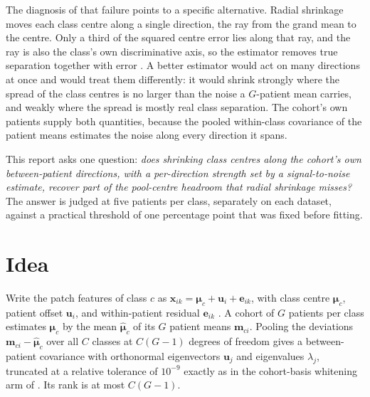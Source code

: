 \documentclass[11pt]{article}
\begin{document}
The diagnosis of that failure points to a specific alternative. Radial shrinkage moves each class centre along a single direction, the ray from the grand mean to the centre. Only a third of the squared centre error lies along that ray, and the ray is also the class's own discriminative axis, so the estimator removes true separation together with error \citep{queisler2026centreShrinkage}. A better estimator would act on many directions at once and would treat them differently: it would shrink strongly where the spread of the class centres is no larger than the noise a $G$-patient mean carries, and weakly where the spread is mostly real class separation. The cohort's own patients supply both quantities, because the pooled within-class covariance of the patient means estimates the noise along every direction it spans.

This report asks one question: \emph{does shrinking class centres along the cohort's own between-patient directions, with a per-direction strength set by a signal-to-noise estimate, recover part of the pool-centre headroom that radial shrinkage misses?} The answer is judged at five patients per class, separately on each dataset, against a practical threshold of one percentage point that was fixed before fitting.

\section{Idea}
\label{sec:idea}
Write the patch features of class $c$ as $\mathbf x_{ik}=\boldsymbol\mu_c+\mathbf u_i+\mathbf e_{ik}$, with class centre $\boldsymbol\mu_c$, patient offset $\mathbf u_i$, and within-patient residual $\mathbf e_{ik}$ \citep{queisler2026centreError}. A cohort of $G$ patients per class estimates $\boldsymbol\mu_c$ by the mean $\hat{\boldsymbol\mu}_c$ of its $G$ patient means $\mathbf m_{ci}$. Pooling the deviations $\mathbf m_{ci}-\hat{\boldsymbol\mu}_c$ over all $C$ classes at $C(G-1)$ degrees of freedom gives a between-patient covariance with orthonormal eigenvectors $\mathbf u_j$ and eigenvalues $\lambda_j$, truncated at a relative tolerance of $10^{-9}$ exactly as in the cohort-basis whitening arm of \citet{queisler2026patientDirections}. Its rank is at most $C(G-1)$.
\end{document}
